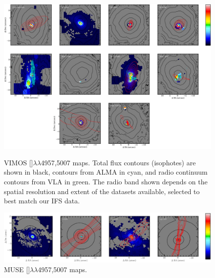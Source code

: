 		\begin{figure}
			\centering
			\includegraphics[width=\textwidth]{chapter5/vimos/Hb.png}
			\caption[VIMOS  maps]{VIMOS []$\lambda\lambda$4957,5007 maps. Total flux contours (isophotes) are shown in black,  contours from ALMA in cyan, and radio continuum contours from VLA in green. The radio band shown depends on the spatial resolution and extent of the datasets available, selected to best match our IFS data.\label{fig:VIMOS_OIII}} 
			
			\vspace{\floatsep}
			\includegraphics[width=\textwidth]{chapter5/muse/Hb.png}
			\caption[MUSE  maps]{MUSE []$\lambda\lambda$4957,5007 maps.\label{fig:MUSE_OIII}} 
			
		\end{figure}


		



